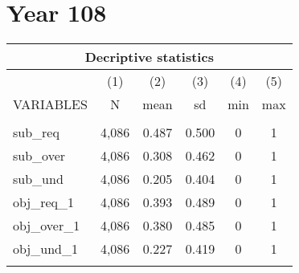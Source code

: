 \documentclass[]{article}
\begin{document}
\section*{Year 108}
\begin{tabular}{lccccc}
\multicolumn{6}{c}{Decriptive statistics} \\ \hline
 & (1) & (2) & (3) & (4) & (5) \\
VARIABLES & N & mean & sd & min & max \\ \hline
 &  &  &  &  &  \\
sub\_req & 4,086 & 0.487 & 0.500 & 0 & 1 \\
sub\_over & 4,086 & 0.308 & 0.462 & 0 & 1 \\
sub\_und & 4,086 & 0.205 & 0.404 & 0 & 1 \\
obj\_req\_1 & 4,086 & 0.393 & 0.489 & 0 & 1 \\
obj\_over\_1 & 4,086 & 0.380 & 0.485 & 0 & 1 \\
obj\_und\_1 & 4,086 & 0.227 & 0.419 & 0 & 1 \\
 &  &  &  &  &  \\ \hline
\end{tabular}
\end{document}
